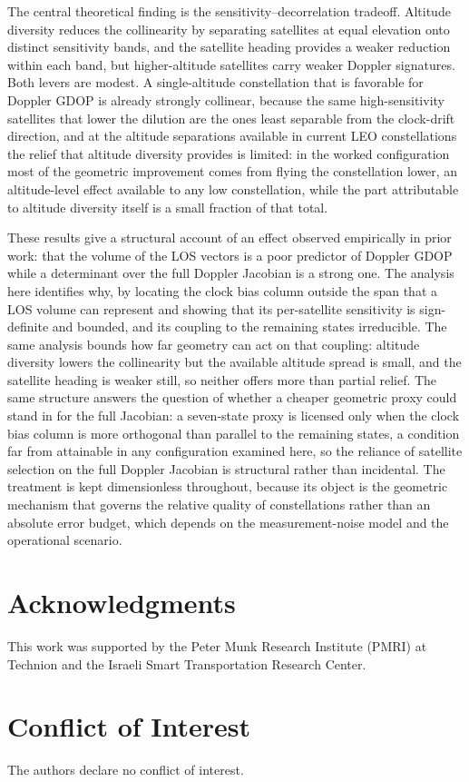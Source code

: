 \documentclass[letterpaper,times]{IONconf-v2}
\theoremstyle{plain}
\theoremstyle{remark}
\begin{document}
The central theoretical finding is the sensitivity--decorrelation tradeoff. Altitude diversity reduces the collinearity by separating satellites at equal elevation onto distinct sensitivity bands, and the satellite heading provides a weaker reduction within each band, but higher-altitude satellites carry weaker Doppler signatures. Both levers are modest. A single-altitude constellation that is favorable for Doppler GDOP is already strongly collinear, because the same high-sensitivity satellites that lower the dilution are the ones least separable from the clock-drift direction, and at the altitude separations available in current LEO constellations the relief that altitude diversity provides is limited: in the worked configuration most of the geometric improvement comes from flying the constellation lower, an altitude-level effect available to any low constellation, while the part attributable to altitude diversity itself is a small fraction of that total.

These results give a structural account of an effect observed empirically in prior work: that the volume of the LOS vectors is a poor predictor of Doppler GDOP while a determinant over the full Doppler Jacobian is a strong one. The analysis here identifies why, by locating the clock bias column outside the span that a LOS volume can represent and showing that its per-satellite sensitivity is sign-definite and bounded, and its coupling to the remaining states irreducible. The same analysis bounds how far geometry can act on that coupling: altitude diversity lowers the collinearity but the available altitude spread is small, and the satellite heading is weaker still, so neither offers more than partial relief. The same structure answers the question of whether a cheaper geometric proxy could stand in for the full Jacobian: a seven-state proxy is licensed only when the clock bias column is more orthogonal than parallel to the remaining states, a condition far from attainable in any configuration examined here, so the reliance of satellite selection on the full Doppler Jacobian is structural rather than incidental. The treatment is kept dimensionless throughout, because its object is the geometric mechanism that governs the relative quality of constellations rather than an absolute error budget, which depends on the measurement-noise model and the operational scenario.

\vspace{-10pt}

\section*{Acknowledgments}

This work was supported by the Peter Munk Research Institute (PMRI) at Technion and  the Israeli Smart Transportation Research Center.

\vspace{-10pt}

\section*{Conflict of Interest}
The authors declare no conflict of interest.

\vspace{-10pt}

\printbibliography[title=References]
\end{document}
